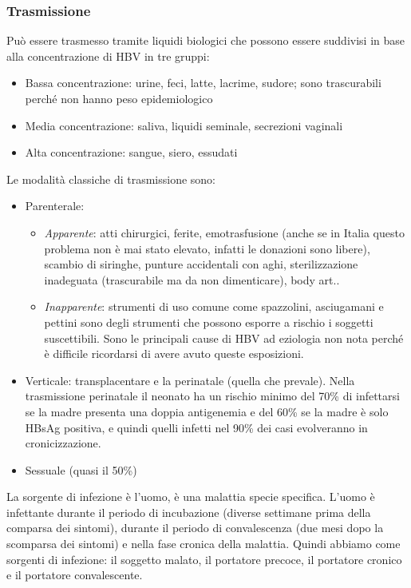 \subsubsection{Trasmissione} 
Può essere trasmesso
  tramite liquidi biologici che possono essere suddivisi in base alla
  concentrazione di HBV in tre gruppi:

\begin{itemize}
\item
  Bassa concentrazione: urine, feci, latte, lacrime, sudore; sono
  trascurabili perché non hanno peso epidemiologico
\item
  Media concentrazione: saliva, liquidi seminale, secrezioni vaginali
\item
  Alta concentrazione: sangue, siero, essudati
\end{itemize}
 
  Le modalità classiche di trasmissione sono:

\begin{itemize}
\item
  Parenterale:
\begin{itemize}
\item
  \emph{Apparente}: atti chirurgici, ferite, emotrasfusione (anche se
  in Italia questo problema non è mai stato elevato, infatti le
  donazioni sono libere), scambio di siringhe, punture accidentali con
  aghi, sterilizzazione inadeguata (trascurabile ma da non dimenticare),
  body art..
\item
  \emph{Inapparente}: strumenti di uso comune come spazzolini,
  asciugamani e pettini sono degli strumenti che possono esporre a
  rischio i soggetti suscettibili. Sono le principali cause di HBV ad
  eziologia non nota perché è difficile ricordarsi di avere avuto queste
  esposizioni.
  \end{itemize}
\item
  Verticale: transplacentare e la perinatale (quella che prevale). Nella
  trasmissione perinatale il neonato ha un rischio minimo del 70\% di
  infettarsi se la madre presenta una doppia antigenemia e del 60\% se
  la madre è solo HBsAg positiva, e quindi quelli infetti nel 90\% dei
  casi evolveranno in cronicizzazione.
\item
  Sessuale (quasi il 50\%)
\end{itemize}
  La sorgente di infezione è l'uomo, è una malattia specie specifica.
  L'uomo è infettante durante il periodo di incubazione (diverse
  settimane prima della comparsa dei sintomi), durante il periodo di
  convalescenza (due mesi dopo la scomparsa dei sintomi) e nella fase
  cronica della malattia. Quindi abbiamo come sorgenti di infezione: il
  soggetto malato, il portatore precoce, il portatore cronico e il
  portatore convalescente.

